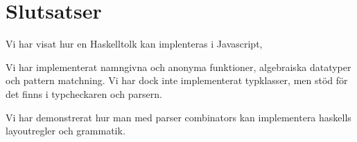 \section{Slutsatser}
Vi har visat hur en Haskelltolk kan implenteras i Javascript,

Vi har implementerat namngivna och anonyma funktioner, algebraiska datatyper och pattern matchning. 
Vi har dock inte implementerat typklasser, men stöd för det finns i typcheckaren och parsern.

Vi har demonstrerat hur man med parser combinators kan implementera haskells layoutregler och grammatik.


